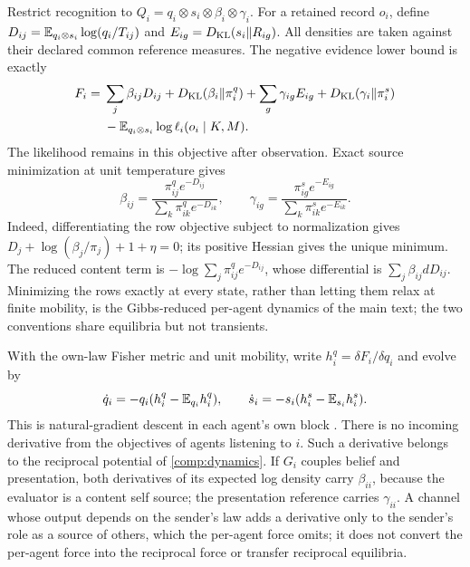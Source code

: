 Restrict recognition to $Q_i=q_i\otimes s_i\otimes\beta_i\otimes\gamma_i$. For a retained record $o_i$, define $D_{ij}=\mathbb E_{q_i\otimes s_i}\log(q_i/T_{ij})$ and $E_{ig}=D_{\mathrm{KL}}(s_i\Vert R_{ig})$. All densities are taken against their declared common reference measures. The negative evidence lower bound is exactly
\begin{equation}
 \begin{aligned}
 F_i={}&\sum_j\beta_{ij}D_{ij}+D_{\mathrm{KL}}(\beta_i\Vert\pi_i^q)
       +\sum_g\gamma_{ig}E_{ig}+D_{\mathrm{KL}}(\gamma_i\Vert\pi_i^s)\\
     &-\mathbb E_{q_i\otimes s_i}\log\ell_i(o_i\mid K,M).
 \end{aligned}
 \label{cp:free-energy}
\end{equation}
The likelihood remains in this objective after observation. Exact source minimization at unit temperature gives
\begin{equation}
 \beta_{ij}=\frac{\pi_{ij}^qe^{-D_{ij}}}{\sum_k\pi_{ik}^qe^{-D_{ik}}},
 \qquad
 \gamma_{ig}=\frac{\pi_{ig}^se^{-E_{ig}}}{\sum_k\pi_{ik}^se^{-E_{ik}}}.
 \label{cp:gibbs}
\end{equation}
Indeed, differentiating the row objective subject to normalization gives $D_j+\log(\beta_j/\pi_j)+1+\eta=0$; its positive Hessian gives the unique minimum. The reduced content term is $-\log\sum_j\pi_{ij}^qe^{-D_{ij}}$, whose differential is $\sum_j\beta_{ij}dD_{ij}$. Minimizing the rows exactly at every state, rather than letting them relax at finite mobility, is the Gibbs-reduced per-agent dynamics of the main text; the two conventions share equilibria but not transients.

With the own-law Fisher metric and unit mobility, write $h_i^q=\delta F_i/\delta q_i$ and evolve by
\begin{equation}
 \dot q_i=-q_i(h_i^q-\mathbb E_{q_i}h_i^q),\qquad
 \dot s_i=-s_i(h_i^s-\mathbb E_{s_i}h_i^s).
 \label{cp:own-flow}
\end{equation}
This is natural-gradient descent in each agent's own block \citep{Amari1998}. There is no incoming derivative from the objectives of agents listening to $i$. Such a derivative belongs to the reciprocal potential of \cref{comp:dynamics}. If $G_i$ couples belief and presentation, both derivatives of its expected log density carry $\beta_{ii}$, because the evaluator is a content self source; the presentation reference carries $\gamma_{ii}$. A channel whose output depends on the sender's law adds a derivative only to the sender's role as a source of others, which the per-agent force omits; it does not convert the per-agent force into the reciprocal force or transfer reciprocal equilibria.

